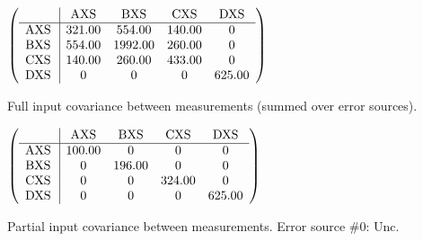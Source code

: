 \begin{table}[H]
\scriptsize
\begin{center}
\renewcommand{\arraystretch}{1.1}
\begin{math}\left(\begin{array}{c|cccc}
 & \mathrm{AXS} & 
\mathrm{BXS} & 
\mathrm{CXS} & 
\mathrm{DXS} \\
\hline
\mathrm{AXS} \hspace*{2pt} &     321.00 &     554.00 &     140.00 &  0 \\
\mathrm{BXS} \hspace*{2pt} &     554.00 &    1992.00 &     260.00 &  0 \\
\mathrm{CXS} \hspace*{2pt} &     140.00 &     260.00 &     433.00 &  0 \\
\mathrm{DXS} \hspace*{2pt} &  0 &  0 &  0 &     625.00 \\
\end{array}\right)\end{math}
\caption{Full input covariance between measurements (summed over error sources).}
\renewcommand{\arraystretch}{1}
\end{center}
\end{table}
\begin{table}[H]
\scriptsize
\begin{center}
\renewcommand{\arraystretch}{1.1}
\begin{math}\left(\begin{array}{c|cccc}
 & \mathrm{AXS} & 
\mathrm{BXS} & 
\mathrm{CXS} & 
\mathrm{DXS} \\
\hline
\mathrm{AXS} \hspace*{2pt} &     100.00 &  0 &  0 &  0 \\
\mathrm{BXS} \hspace*{2pt} &  0 &     196.00 &  0 &  0 \\
\mathrm{CXS} \hspace*{2pt} &  0 &  0 &     324.00 &  0 \\
\mathrm{DXS} \hspace*{2pt} &  0 &  0 &  0 &     625.00 \\
\end{array}\right)\end{math}
\caption{Partial input covariance between measurements. Error source \#0: Unc.}
\renewcommand{\arraystretch}{1}
\end{center}
\end{table}
